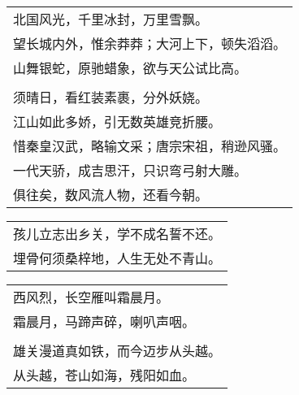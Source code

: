 \nopagebreak%
\nopagebreak%
\noindent\begin{minipage}{\linewidth}
  \vskip-3pt\begin{table}[H]
    \centering
    \begin{tabular}{@{}l@{}}
北国风光，千里冰封，万里雪飘。\\
望长城内外，惟余莽莽；大河上下，顿失滔滔。\\
山舞银蛇，原驰蜡象，欲与天公试比高。\\
\\
须晴日，看红装素裹，分外妖娆。\\
江山如此多娇，引无数英雄竞折腰。\\
惜秦皇汉武，略输文采；唐宗宋祖，稍逊风骚。\\
一代天骄，成吉思汗，只识弯弓射大雕。\\
俱往矣，数风流人物，还看今朝。
    \end{tabular}
  \end{table}
\end{minipage}
\vspace{1cm}


\nopagebreak%
\nopagebreak%
\noindent\begin{minipage}{\linewidth}
  \vskip-3pt\begin{table}[H]
    \centering
    \begin{tabular}{@{}l@{}}
孩儿立志出乡关，学不成名誓不还。\\
埋骨何须桑梓地，人生无处不青山。
    \end{tabular}
  \end{table}
\end{minipage}
\vspace{1cm}


\nopagebreak%
\nopagebreak%
\noindent\begin{minipage}{\linewidth}
  \vskip-3pt\begin{table}[H]
    \centering
    \begin{tabular}{@{}l@{}}
西风烈，长空雁叫霜晨月。\\
霜晨月，马蹄声碎，喇叭声咽。\\
\\
雄关漫道真如铁，而今迈步从头越。\\
从头越，苍山如海，残阳如血。
    \end{tabular}
  \end{table}
\end{minipage}
\vspace{1cm}


